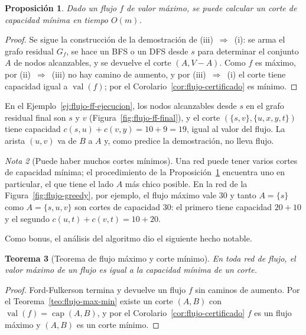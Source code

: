 \documentclass[12pt, spanish, oneside, openany]{book}
\theoremstyle{uprightplain}
\newtheorem{teorema}{Teorema}[section]
\newtheorem{proposicion}[teorema]{Proposición}
\theoremstyle{definition}
\theoremstyle{remark}
\newtheorem{nota}[teorema]{Nota}
\theoremstyle{definition}
\newcommand{\val}{\operatorname{val}}   %
\newcommand{\capac}{\operatorname{cap}} %
\begin{document}
\begin{proposicion}
\label{prop:flujo-corte-minimo-om}
Dado un flujo $f$ de valor máximo, se puede calcular un corte de capacidad mínima en tiempo $O(m)$.
\end{proposicion}
\begin{proof}
Se sigue la construcción de la demostración de (iii)~$\Rightarrow$~(i): se arma el grafo residual $G_f$, se hace un BFS o un DFS desde $s$ para determinar el conjunto $A$ de nodos alcanzables, y se devuelve el corte $(A,V-A)$. Como $f$ es máximo, por (ii)~$\Rightarrow$~(iii) no hay camino de aumento, y por (iii)~$\Rightarrow$~(i) el corte tiene capacidad igual a $\val(f)$; por el Corolario~\ref{cor:flujo-certificado} es mínimo.
\end{proof}

En el Ejemplo~\ref{ej:flujo-ff-ejecucion}, los nodos alcanzables desde $s$ en el grafo residual final son $s$ y $v$ (Figura~\ref{fig:flujo-ff-final}), y el corte $(\{s,v\},\{u,x,y,t\})$ tiene capacidad $c(s,u)+c(v,y)=10+9=19$, igual al valor del flujo. La arista $(u,v)$ va de $B$ a $A$ y, como predice la demostración, no lleva flujo.

\begin{nota}[Puede haber muchos cortes mínimos]
\label{nota:flujo-varios-cortes}
Una red puede tener varios cortes de capacidad mínima; el procedimiento de la Proposición~\ref{prop:flujo-corte-minimo-om} encuentra uno en particular, el que tiene el lado $A$ más chico posible. En la red de la Figura~\ref{fig:flujo-greedy}, por ejemplo, el flujo máximo vale $30$ y tanto $A=\{s\}$ como $A=\{s,u,v\}$ son cortes de capacidad $30$: el primero tiene capacidad $20+10$ y el segundo $c(u,t)+c(v,t)=10+20$.
\end{nota}

Como bonus, el análisis del algoritmo dio el siguiente hecho notable.

\begin{teorema}[Teorema de flujo máximo y corte mínimo]
\label{teo:flujo-mfmc}
En toda red de flujo, el valor máximo de un flujo es igual a la capacidad mínima de un corte.
\end{teorema}
\begin{proof}
Ford-Fulkerson termina y devuelve un flujo $f$ sin caminos de aumento. Por el Teorema~\ref{teo:flujo-max-min} existe un corte $(A,B)$ con $\val(f)=\capac(A,B)$, y por el Corolario~\ref{cor:flujo-certificado} $f$ es un flujo máximo y $(A,B)$ es un corte mínimo.
\end{proof}
\end{document}
